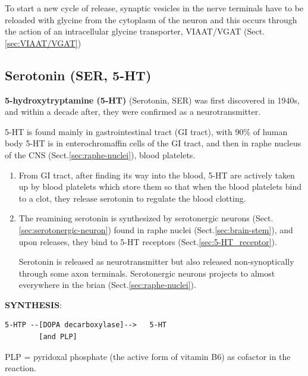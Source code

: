 To start a new cycle of release, synaptic vesicles in the nerve terminals have
to be reloaded with glycine from the cytoplasm of the neuron and this occurs
through the action of an intracellular glycine transporter, VIAAT/VGAT
(Sect.\ref{sec:VIAAT/VGAT})


\subsection{Serotonin (SER, 5-HT)}
\label{sec:serotonin}

{\bf 5-hydroxytryptamine (5-HT)} (Serotonin, SER) was first discovered in 1940s,
and within a decade after, they were confirmed as a neurotransmitter.


5-HT is found mainly in  gastrointestinal tract (GI tract), with 90\% of human
body 5-HT is in  enterochromaffin cells of the GI tract, 
and then in raphe nucleus of the CNS (Sect.\ref{sec:raphe-nuclei}), blood
platelets.

\begin{enumerate}

  \item  From GI tract, after finding its way into the blood, 5-HT are actively
  taken up by blood platelets which store them so that when the blood platelets
  bind to a clot, they release serotonin to regulate the blood clotting.

  \item The reamining serotonin is synthesized by serotonergic neurons
(Sect.\ref{sec:serotonergic-neuron}) found in raphe nuclei
(Sect.\ref{sec:brain-stem}), and upon releases, they bind to 5-HT
receptors (Sect.\ref{sec:5-HT_receptor}).

Serotonin is released as neurotransmitter but also released non-synoptically
through some axon terminals. Serotonergic neurons projects to almost everywhere in the brian
(Sect.\ref{sec:raphe-nuclei}).
\end{enumerate}

{\bf SYNTHESIS}: 
\begin{verbatim}
5-HTP --[DOPA decarboxylase]-->   5-HT
        [and PLP]
\end{verbatim}

PLP = pyridoxal phosphate (the active form of vitamin B6) as cofactor in the
reaction.


